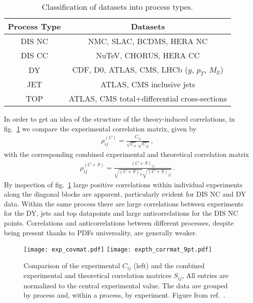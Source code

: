     \begin{table}[t]
        \centering
        \renewcommand*{\arraystretch}{1.3}
        \begin{tabular}{|c|c|}
          \hline
          Process Type  & Datasets \\
          \hline
          DIS NC  &   NMC, SLAC, BCDMS, HERA NC \\
          DIS CC  &   NuTeV, CHORUS, HERA CC \\
          DY  & CDF, D0, ATLAS, CMS, LHCb ($y$, $p_T$, $M_{ll}$) \\
          JET  & ATLAS, CMS inclusive jets \\
          TOP  & ATLAS, CMS total+differential cross-sections \\
          \hline
        \end{tabular}
        \caption{\label{eq:expclassification}
         Classification of  datasets into  process types.
        }
    \end{table}
    In order to get an idea of the structure of the theory-induced correlations,
    in fig.~\ref{fig:covmats} we compare the experimental correlation matrix, given by
    \begin{align}
        \rho^{(C)}_{ij} = \frac{C_{ij}}{\sqrt{C_{ii}}\sqrt{C_{jj}}}\,,
    \end{align}
    with the corresponding combined experimental and theoretical correlation matrix
    \begin{align}
        \rho^{(C+S)}_{ij} = \frac{\left(C+S\right)_{ij}}{ \sqrt{\left(C+S\right)_{ii}} \sqrt{\left(C+S\right)_{jj}} }\,.
    \end{align}
    By inspection of fig.~\ref{fig:covmats} large positive correlations within individual experiments along 
    the diagonal blocks are apparent, particularly evident for DIS NC and DY data.
    Within the same process there are large correlations between experiments for the DY, jets and top datapoints 
    and large anticorrelations for the DIS NC points. Correlations and anticorrelations between different processes,
    despite being present thanks to PDFs universality, are generally weaker.

    \begin{figure}[t!]
    \begin{center}
        \texttt{[image: exp\_covmat.pdf]}
        \texttt{[image: expth\_corrmat\_9pt.pdf]}
        \caption{\small Comparison of the  experimental $C_{ij}$ (left)
        and the combined experimental and theoretical correlation matrices $S_{ij}$, 
        All entries are normalized to the central  experimental value.
        The data are grouped by process and, within a process, by experiment. Figure from ref.~\cite{AbdulKhalek:2019ihb}.} 
        \label{fig:covmats}     
    \end{center}
    \end{figure}

